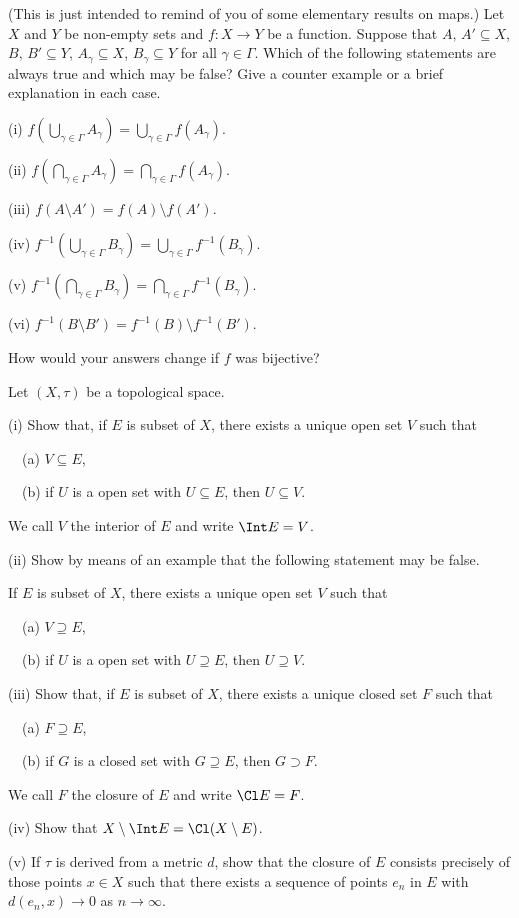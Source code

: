 \begin{problem}\label{E;inverse}
(This is just intended
to remind of you of some elementary results on maps.)
Let $X$ and $Y$ be non-empty sets and $f:X\rightarrow Y$
be a function. Suppose that $A,\,A'\subseteq X$, $B,\,B'\subseteq Y$,
$A_{\gamma}\subseteq X$, $B_{\gamma}\subseteq Y$
for all $\gamma\in\Gamma$. Which of the following statements
are always true and which may be false?
Give a counter example or a brief explanation in each case.


(i) $f(\bigcup_{\gamma\in\Gamma}A_{\gamma})
= \bigcup_{\gamma\in\Gamma}f(A_{\gamma})$.

(ii) $f(\bigcap_{\gamma\in\Gamma}A_{\gamma})
= \bigcap_{\gamma\in\Gamma}f(A_{\gamma})$.

(iii) $f(A\setminus A')=f(A)\setminus f(A')$.

(iv) $f^{-1}(\bigcup_{\gamma\in\Gamma}B_{\gamma})
= \bigcup_{\gamma\in\Gamma}f^{-1}(B_{\gamma})$.

(v) $f^{-1}(\bigcap_{\gamma\in\Gamma}B_{\gamma})
= \bigcap_{\gamma\in\Gamma}f^{-1}(B_{\gamma})$.

(vi) $f^{-1}(B\setminus B')=f^{-1}(B)\setminus f^{-1}(B')$.

How would your answers change if $f$ was bijective?
\end{problem}
\begin{problem}\label{E;interior}
Let $(X,\tau)$ be a topological space.

(i) Show that, if $E$ is subset of $X$, there exists a unique
open set $V$ such that

\ \ (a) $V\subseteq E$,

\ \ (b) if $U$ is a open set with $U\subseteq E$,
then $U\subseteq V$.

We call $V$ the interior of $E$ and write $\Int E=V$.

(ii) Show by means of an example that the following statement
may be false.

If $E$ is subset of $X$, there exists a unique
open set $V$ such that

\ \ (a) $V\supseteq E$,

\ \ (b) if $U$ is a open set with $U\supseteq E$,
then $U\supseteq V$.

(iii) Show that, if $E$ is subset of $X$, there exists a unique
closed set $F$ such that

\ \ (a) $F\supseteq E$,

\ \ (b) if $G$ is a closed set with $G\supseteq E$,
then $G\supset F$.

We call $F$ the closure of $E$ and write $\Cl E=F$.

(iv) Show that $X\setminus \Int E=\Cl(X\setminus E)$.

(v) If $\tau$ is derived from a metric $d$,
show that the closure of $E$ consists precisely
of those points $x\in X$ such that there exists a sequence
of points $e_{n}$ in $E$
with $d(e_{n},x)\rightarrow 0$ as $n\rightarrow\infty$.
\end{problem}
